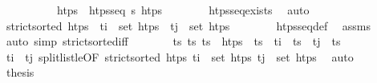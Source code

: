 \begin{isabellebody}
%
\isadelimproof
\ \ %
\endisadelimproof
%
\isatagproof
{}\isamarkupfalse%
\ {\isacharminus}{\kern0pt}\isanewline
\ \ \ \ \isamarkupfalse%
\ htps\ \ {\isachardoublequoteopen}htps{\isacharunderscore}{\kern0pt}seq\ {\isasympi}s\ htps{\isachardoublequoteclose}\isanewline
\ \ \ \ \ \ \isamarkupfalse%
\ htps{\isacharunderscore}{\kern0pt}seq{\isacharunderscore}{\kern0pt}exists\ \isamarkupfalse%
\ auto\isanewline
\ \ \ \ \isamarkupfalse%
\ \isamarkupfalse%
\ {\isachardoublequoteopen}strict{\isacharunderscore}{\kern0pt}sorted\ htps{\isachardoublequoteclose}\ \ {\isachardoublequoteopen}t\isactrlsub i\ {\isasymin}\ set\ htps{\isachardoublequoteclose}\ \ {\isachardoublequoteopen}t\isactrlsub j\ {\isasymin}\ set\ htps{\isachardoublequoteclose}\isanewline
\ \ \ \ \ \ \isamarkupfalse%
\ htps{\isacharunderscore}{\kern0pt}seq{\isacharunderscore}{\kern0pt}def\ \isamarkupfalse%
\ assms\ \isamarkupfalse%
\ {\isacharparenleft}{\kern0pt}auto\ simp{\isacharcolon}{\kern0pt}\ strict{\isacharunderscore}{\kern0pt}sorted{\isacharunderscore}{\kern0pt}iff{\isacharparenright}{\kern0pt}\isanewline
\ \ \ \ \isamarkupfalse%
\ \isamarkupfalse%
\ ts\ ts\ ts\ \ {\isachardoublequoteopen}htps\ {\isacharequal}{\kern0pt}\ ts\ {\isacharat}{\kern0pt}\ t\isactrlsub i\ {\isacharhash}{\kern0pt}\ ts\ {\isacharat}{\kern0pt}\ t\isactrlsub j\ {\isacharhash}{\kern0pt}\ ts\isanewline
\ \ \ \ \ \ \isamarkupfalse%
\ {\isacartoucheopen}t\isactrlsub i\ {\isacharless}{\kern0pt}\ t\isactrlsub j{\isacartoucheclose}\ split{\isacharunderscore}{\kern0pt}list{}{\isacharunderscore}{\kern0pt}le{\isacharbrackleft}{\kern0pt}OF\ {\isacartoucheopen}strict{\isacharunderscore}{\kern0pt}sorted\ htps{\isacartoucheclose}\ {\isacartoucheopen}t\isactrlsub i\ {\isasymin}\ set\ htps{\isacartoucheclose}\ {\isacartoucheopen}t\isactrlsub j\ {\isasymin}\ set\ htps{\isacartoucheclose}{\isacharbrackright}{\kern0pt}\ \isamarkupfalse%
\ auto\isanewline
\ \ \ \ \isamarkupfalse%
\ \isamarkupfalse%
\ {\isacharquery}{\kern0pt}thesis\isanewline
\ \ \ \ \ \ \isamarkupfalse%

\end{isabellebody}
